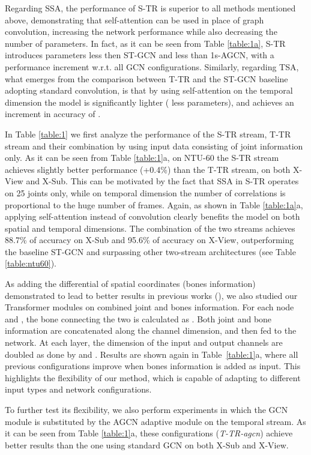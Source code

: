 \documentclass[times,twocolumn,final,authoryear]{elsarticle}
\begin{document}
Regarding SSA, the performance of S-TR is superior to all methods mentioned above, demonstrating that self-attention can be used in place of graph convolution, increasing the network performance while also decreasing the number of parameters. 
In fact, as it can be seen from Table \ref{table:1a}, S-TR introduces  parameters less then ST-GCN and  less than 1s-AGCN, with a performance increment w.r.t. all GCN configurations. Similarly, regarding TSA, what emerges from the comparison between T-TR and the ST-GCN baseline adopting standard convolution, is that by using self-attention on the temporal dimension the model is significantly lighter ( less parameters), and achieves an increment in accuracy of . 


In Table \ref{table:1} we first analyze the performance of the S-TR stream, T-TR stream and their combination by using input data consisting of joint information only. As it can be seen from Table \ref{table:1}a, on NTU-60 the S-TR stream achieves slightly better performance (+0.4\%) than the T-TR stream, on both X-View and X-Sub. This can be motivated by the fact that SSA in S-TR operates on 25 joints only, while on temporal dimension the number of correlations is proportional to the huge number of frames. Again, as shown in Table \ref{table:1a}a, applying self-attention instead of convolution clearly benefits the model on both spatial and temporal dimensions. The combination of the two streams achieves 88.7\% of accuracy on X-Sub and 95.6\% of accuracy on X-View,  outperforming the baseline ST-GCN and surpassing other two-stream architectures (see Table \ref{table:ntu60}).


As adding the differential of spatial coordinates (bones information) demonstrated to lead to better results in previous works (\cite{dirgraph,2s-cnn}), we also studied our Transformer modules on combined joint and bones information. For each node  and , the bone connecting the two is calculated as 
    .
Both joint and bone information are concatenated along the channel dimension, and then fed to the network. At each layer, the dimension of the input and output channels are doubled as done by \cite{dirgraph} and \cite{2s-cnn}. Results are shown again in Table~\ref{table:1}a, where all previous configurations improve when bones information is added as input. This highlights the flexibility of our method, which is capable of adapting to different input types and network configurations. 

To further test its flexibility, we also perform experiments in which the GCN module is substituted by the AGCN adaptive module on the temporal stream. As it can be seen from Table \ref{table:1}a, these configurations (\textit{T-TR-agcn}) achieve better results than the one using standard GCN on both X-Sub and X-View.
\end{document}
